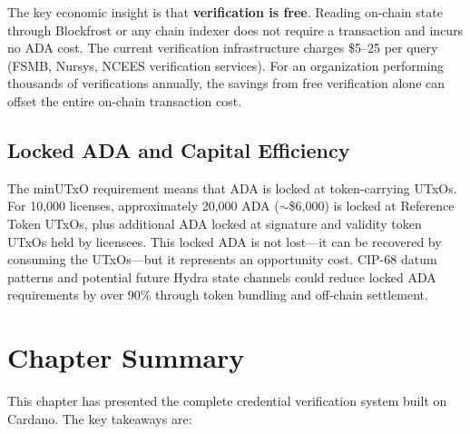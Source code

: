 The key economic insight is that \textbf{verification is free}. Reading on-chain state through Blockfrost or any chain indexer does not require a transaction and incurs no ADA cost. The current verification infrastructure charges \$5--25 per query (FSMB, Nursys, NCEES verification services). For an organization performing thousands of verifications annually, the savings from free verification alone can offset the entire on-chain transaction cost.

\subsection{Locked ADA and Capital Efficiency}

The minUTxO requirement means that ADA is locked at token-carrying UTxOs. For 10,000 licenses, approximately 20,000 ADA ($\sim$\$6,000) is locked at Reference Token UTxOs, plus additional ADA locked at signature and validity token UTxOs held by licensees. This locked ADA is not lost---it can be recovered by consuming the UTxOs---but it represents an opportunity cost. CIP-68 datum patterns and potential future Hydra state channels could reduce locked ADA requirements by over 90\% through token bundling and off-chain settlement.


\section{Chapter Summary}
\label{sec:ch5-summary}

This chapter has presented the complete credential verification system built on Cardano. The key takeaways are:

